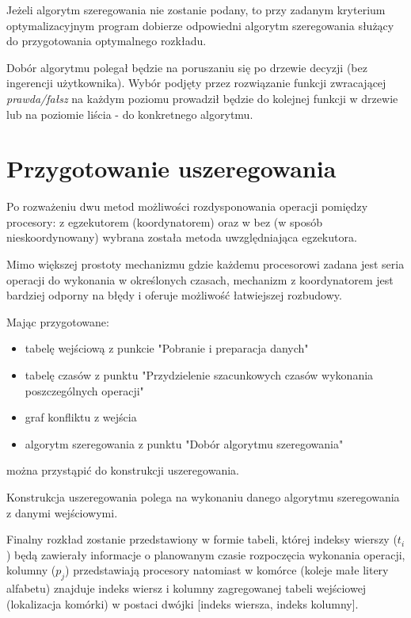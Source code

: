 \documentclass[brudnopis]{xmgr}
\begin{document}
Jeżeli algorytm szeregowania nie zostanie podany, to przy zadanym kryterium optymalizacyjnym program dobierze odpowiedni algorytm szeregowania służący do przygotowania optymalnego rozkładu.

Dobór algorytmu polegał będzie na poruszaniu się po drzewie decyzji (bez ingerencji użytkownika).
Wybór podjęty przez rozwiązanie funkcji zwracającej \emph{prawda/fałsz} na każdym poziomu prowadził będzie do kolejnej funkcji w drzewie lub na poziomie liścia - do konkretnego algorytmu.

\section{Przygotowanie uszeregowania}

Po rozważeniu dwu metod możliwości rozdysponowania operacji pomiędzy procesory: z egzekutorem (koordynatorem) oraz w bez (w sposób nieskoordynowany) wybrana została metoda uwzględniająca egzekutora.

Mimo większej prostoty mechanizmu gdzie każdemu procesorowi zadana jest seria operacji do wykonania w określonych czasach, mechanizm z koordynatorem jest bardziej odporny na błędy i oferuje możliwość łatwiejszej rozbudowy.

Mając przygotowane:

\begin{itemize}
    \item tabelę wejściową z punkcie "Pobranie i preparacja danych"
    \item tabelę czasów z punktu "Przydzielenie szacunkowych czasów wykonania poszczególnych operacji"
    \item graf konfliktu z wejścia
    \item algorytm szeregowania z punktu "Dobór algorytmu szeregowania"
\end{itemize}

można przystąpić do konstrukcji uszeregowania.

Konstrukcja uszeregowania polega na wykonaniu danego algorytmu szeregowania z danymi wejściowymi.

Finalny rozkład zostanie przedstawiony w formie tabeli, której indeksy wierszy ($t_i$) będą zawierały informacje o planowanym czasie rozpoczęcia wykonania operacji, kolumny ($p_j$) przedstawiają procesory natomiast w komórce (koleje małe litery alfabetu) znajduje indeks wiersz i kolumny zagregowanej tabeli wejściowej (lokalizacja komórki) w postaci dwójki [indeks wiersza, indeks kolumny].
\end{document}
